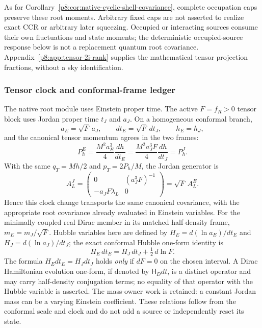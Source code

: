 \documentclass[12pt,a4paper]{article}
\begin{document}
As for Corollary~\ref{p8:cor:native-cyclic-shell-covariance}, complete
occupation caps preserve these root moments. Arbitrary fixed caps are not
asserted to realize exact CCR or arbitrary later squeezing. Occupied or
interacting sources consume their own fluctuations and state moments;
the deterministic occupied-source response below is not a replacement
quantum root covariance. Appendix~\ref{p8:app:tensor-2i-rank} supplies
the mathematical tensor projection fractions, without a sky identification.

\subsubsection{Tensor clock and conformal-frame ledger}
\label{p8:sec:tensor-frame-ledger}
The native root module uses Einstein proper time. The active
$F=f_R>0$ tensor block uses Jordan proper time $t_J$ and $a_J$.
On a homogeneous conformal branch,
\[
 a_E=\sqrt F\,a_J,\qquad dt_E=\sqrt F\,dt_J,\qquad h_E=h_J,
\]
and the canonical tensor momentum agrees in the two frames:
\[
 P_h^E=\frac{M^2a_E^3}{4}\frac{dh}{dt_E}
       =\frac{M^2a_J^3F}{4}\frac{dh}{dt_J}=P_h^J.
\]
With the same $q_T=Mh/2$ and $p_T=2P_h/M$, the Jordan generator is
\[
 A_L^J=\begin{pmatrix}0&(a_J^3F)^{-1}\\
                              -a_JF\lambda_L&0\end{pmatrix}
        =\sqrt F\,A_L^E.
\]
Hence this clock change transports the same canonical covariance, with
the appropriate root covariance already evaluated in Einstein variables.
For the minimally coupled real Dirac member in its matched half-density
frame, $m_E=m_J/\sqrt F$. Hubble variables here are defined by
\(H_E=d(\ln a_E)/dt_E\) and \(H_J=d(\ln a_J)/dt_J\); the exact
conformal Hubble one-form identity is
\[
 \boxed{H_E\,dt_E=H_J\,dt_J+\tfrac12\,d\ln F.}
\]
The formula \(H_Edt_E=H_Jdt_J\) holds \emph{only} if
\(dF=0\) on the chosen interval. A Dirac Hamiltonian evolution
one-form, if denoted by \(\mathsf H_Ddt\), is a distinct operator and
may carry half-density conjugation terms; no equality of that operator
with the Hubble variable is asserted. The mass-owner work is retained:
a constant Jordan mass can be a varying Einstein coefficient.
These relations follow from the conformal scale and clock and do not
add a source or independently reset its state.

\end{document}
